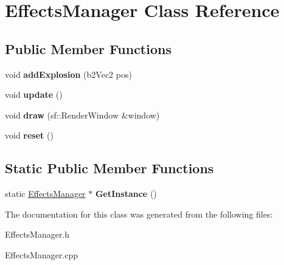 \hypertarget{class_effects_manager}{}\section{Effects\+Manager Class Reference}
\label{class_effects_manager}
\subsection*{Public Member Functions}
\begin{DoxyCompactItemize}
\item 
void {\bfseries add\+Explosion} (b2\+Vec2 pos)\hypertarget{class_effects_manager_a82200800b46713bb55b152e0a6f2eab1}{}\label{class_effects_manager_a82200800b46713bb55b152e0a6f2eab1}

\item 
void {\bfseries update} ()\hypertarget{class_effects_manager_ab5e20cbcbf215d71ff8a89eab39ad766}{}\label{class_effects_manager_ab5e20cbcbf215d71ff8a89eab39ad766}

\item 
void {\bfseries draw} (sf\+::\+Render\+Window \&window)\hypertarget{class_effects_manager_a089f09643f30d3cf6535dc8454624104}{}\label{class_effects_manager_a089f09643f30d3cf6535dc8454624104}

\item 
void {\bfseries reset} ()\hypertarget{class_effects_manager_a5ef9d1ca6a61acc9029a277772943746}{}\label{class_effects_manager_a5ef9d1ca6a61acc9029a277772943746}

\end{DoxyCompactItemize}
\subsection*{Static Public Member Functions}
\begin{DoxyCompactItemize}
\item 
static \hyperlink{class_effects_manager}{Effects\+Manager} $\ast$ {\bfseries Get\+Instance} ()\hypertarget{class_effects_manager_adf0305cff7531a8d781cab8bb0723cf6}{}\label{class_effects_manager_adf0305cff7531a8d781cab8bb0723cf6}

\end{DoxyCompactItemize}


The documentation for this class was generated from the following files\+:\begin{DoxyCompactItemize}
\item 
Effects\+Manager.\+h\item 
Effects\+Manager.\+cpp\end{DoxyCompactItemize}
